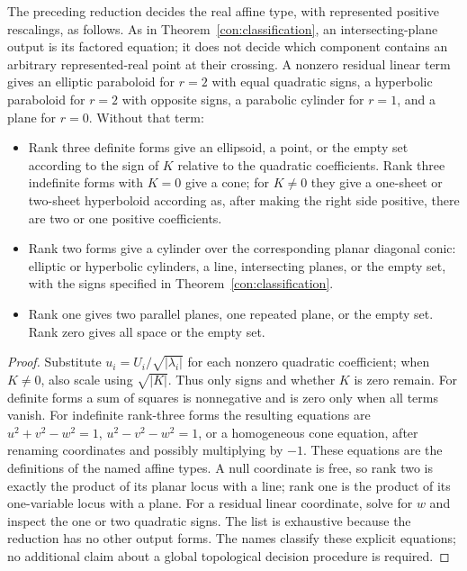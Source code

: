 \begin{corollary}\label{con:quadric-types}
The preceding reduction decides the real affine type, with represented
positive rescalings, as follows. As in Theorem~\ref{con:classification},
an intersecting-plane output is its factored equation; it does not decide
which component contains an arbitrary represented-real point at their
crossing. A nonzero residual linear term gives
an elliptic paraboloid for $r=2$ with equal quadratic signs, a hyperbolic
paraboloid for $r=2$ with opposite signs, a parabolic cylinder for $r=1$,
and a plane for $r=0$. Without that term:
\begin{itemize}
\item Rank three definite forms give an ellipsoid, a point, or the empty
set according to the sign of $K$ relative to the quadratic coefficients.
Rank three indefinite forms with $K=0$ give a cone; for $K\ne0$ they
give a one-sheet or two-sheet hyperboloid according as, after making
the right side positive, there are two or one positive coefficients.
\item Rank two forms give a cylinder over the corresponding planar
diagonal conic: elliptic or hyperbolic cylinders, a line, intersecting
planes, or the empty set, with the signs specified in
Theorem~\ref{con:classification}.
\item Rank one gives two parallel planes, one repeated plane, or the
empty set. Rank zero gives all space or the empty set.
\end{itemize}
\end{corollary}
\begin{proof}
Substitute $u_i=U_i/\sqrt{|\lambda_i|}$ for each nonzero quadratic
coefficient; when $K\ne0$, also scale using
$\sqrt{|K|}$. Thus only signs and whether $K$ is zero remain.
For definite forms a sum of squares is nonnegative and is zero only
when all terms vanish. For indefinite rank-three forms the resulting
equations are $u^2+v^2-w^2=1$, $u^2-v^2-w^2=1$, or a homogeneous
cone equation, after renaming coordinates and possibly multiplying
by $-1$. These equations are the definitions of the named affine
types. A null coordinate is free, so rank two is exactly the product
of its planar locus with a line; rank one is the product of its
one-variable locus with a plane. For a residual linear coordinate,
solve for $w$ and inspect the one or two quadratic signs. The list
is exhaustive because the reduction has no other output forms.
The names classify these explicit equations; no additional claim
about a global topological decision procedure is required.
\end{proof}

